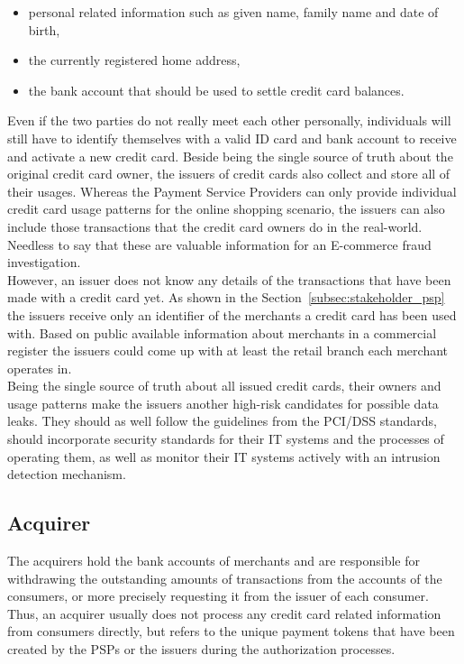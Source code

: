 \begin{itemize}
		\item personal related information such as given name, family name and date of birth,
		\item the currently registered home address,
		\item the bank account that should be used to settle credit card balances.
\end{itemize}

Even if the two parties do not really meet each other personally, individuals will still have to identify themselves with a valid ID card and bank account to receive and activate a new credit card. Beside being the single source of truth about the original credit card owner, the issuers of credit cards also collect and store all of their usages. Whereas the Payment Service Providers can only provide individual credit card usage patterns for the online shopping scenario, the issuers can also include those transactions that the credit card owners do in the real-world. Needless to say that these are valuable information for an \gls{E-commerce} fraud investigation. \\

However, an issuer does not know any details of the transactions that have been made with a credit card yet. As shown in the Section~\ref{subsec:stakeholder_psp} the issuers receive only an identifier of the merchants a credit card has been used with. Based on public available information about merchants in a commercial register the issuers could come up with at least the retail branch each merchant operates in. \\

Being the single source of truth about all issued credit cards, their owners and usage patterns make the issuers another high-risk candidates for possible data leaks. They should as well follow the guidelines from the \gls{PCI/DSS} standards, should incorporate security standards for their \gls{IT} systems and the processes of operating them, as well as monitor their \gls{IT} systems actively with an intrusion detection mechanism.


\subsection{Acquirer}
\label{subsec:stakeholder_acquirer}

The acquirers hold the bank accounts of merchants and are responsible for withdrawing the outstanding amounts of transactions from the accounts of the consumers, or more precisely requesting it from the issuer of each consumer. Thus, an acquirer usually does not process any credit card related information from consumers directly, but refers to the unique payment tokens that have been created by the \gls{PSP}s or the issuers during the authorization processes. \\


